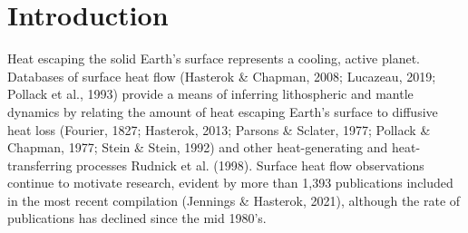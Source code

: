 \documentclass[draft,linenumbers]{agujournal2018}
\begin{document}



\begin{keypoints}
\item 
\item 
\item 
\end{keypoints}

%
%


\begin{abstract}

\end{abstract}
\section{Introduction}

Heat escaping the solid Earth's surface represents a cooling, active
planet. Databases of surface heat flow (Hasterok \& Chapman, 2008;
Lucazeau, 2019; Pollack et al., 1993) provide a means of inferring
lithospheric and mantle dynamics by relating the amount of heat escaping
Earth's surface to diffusive heat loss (Fourier, 1827; Hasterok, 2013;
Parsons \& Sclater, 1977; Pollack \& Chapman, 1977; Stein \& Stein,
1992) and other heat-generating and heat-transferring processes Rudnick
et al. (1998). Surface heat flow observations continue to motivate
research, evident by more than 1,393 publications included in the most
recent compilation (Jennings \& Hasterok, 2021), although the rate of
publications has declined since the mid 1980's.
\end{document}
